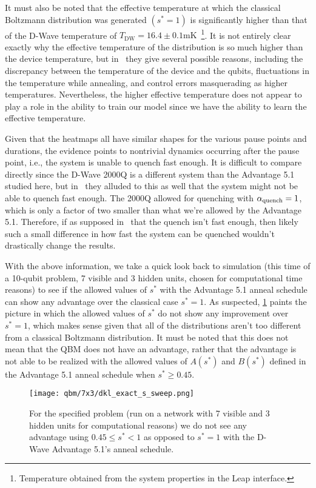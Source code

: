 It must also be noted that the effective temperature at which the classical Boltzmann distribution was generated \( (s^* = 1) \) is significantly higher than that of the D-Wave temperature of \( T_\text{DW} = 16.4 \pm 0.1 \si{\milli\kelvin} \)~\cite{dwave_leap}\footnote{Temperature obtained from the system properties in the Leap interface.}.
It is not entirely clear exactly why the effective temperature of the distribution is so much higher than the device temperature, but in~\cite{marshall_2019} they give several possible reasons, including the discrepancy between the temperature of the device and the qubits, fluctuations in the temperature while annealing, and control errors masquerading as higher temperatures.
Nevertheless, the higher effective temperature does not appear to play a role in the ability to train our model since we have the ability to learn the effective temperature.

Given that the heatmaps all have similar shapes for the various pause points and durations, the evidence points to nontrivial dynamics occurring after the pause point, i.e., the system is unable to quench fast enough.
It is difficult to compare directly since the D-Wave 2000Q is a different system than the Advantage 5.1 studied here, but in~\cite{marshall_2019} they alluded to this as well that the system might not be able to quench fast enough.
The 2000Q allowed for quenching with \( \alpha_{\text{quench}} = 1 \), which is only a factor of two smaller than what we're allowed by the Advantage 5.1.
Therefore, if as supposed in~\cite{marshall_2019} that the quench isn't fast enough, then likely such a small difference in how fast the system can be quenched wouldn't drastically change the results.

With the above information, we take a quick look back to simulation (this time of a 10-qubit problem, 7 visible and 3 hidden units, chosen for computational time reasons) to see if the allowed values of \( s^* \) with the Advantage 5.1 anneal schedule can show any advantage over the classical case \( s^* = 1 \).
As suspected, \cref{fig:s_sweep_exact} paints the picture in which the allowed values of \( s^* \) do not show any improvement over \( s^* = 1 \), which makes sense given that all of the distributions aren't too different from a classical Boltzmann distribution.
It must be noted that this does not mean that the QBM does not have an advantage, rather that the advantage is not able to be realized with the allowed values of \( A(s^*) \) and \( B(s^*) \) defined in the Advantage 5.1 anneal schedule when \( s^* \ge 0.45 \).
\begin{figure}[!htb]
    \begin{center}
        \texttt{[image: qbm/7x3/dkl\_exact\_s\_sweep.png]}
    \end{center}
    \caption{For the specified problem (run on a network with 7 visible and 3 hidden units for computational reasons) we do not see any advantage using \( 0.45 \le s^* < 1 \) as opposed to \( s^* = 1 \) with the D-Wave Advantage 5.1's anneal schedule.}
    \label{fig:s_sweep_exact}
\end{figure}

